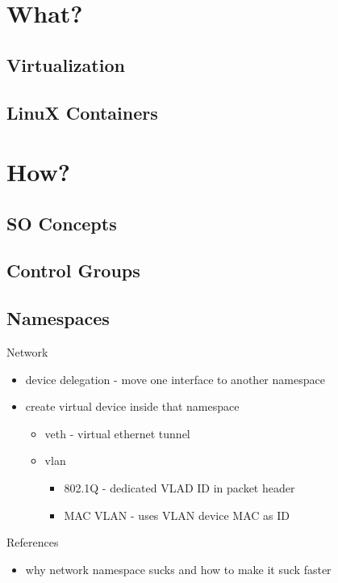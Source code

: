 \documentclass{beamer}
\begin{document}
\section{What?}

\subsection{Virtualization}

\subsection{LinuX Containers}

\section{How?}

\subsection{SO Concepts}

\subsection{Control Groups}

\subsection{Namespaces}

\begin{frame}{Network}
\begin{itemize}
\item device delegation - move one interface to another namespace
\item create virtual device inside that namespace
\begin{itemize}
\item veth - virtual ethernet tunnel
\item vlan
\begin{itemize}
\item 802.1Q - dedicated VLAD ID in packet header
\item MAC VLAN - uses VLAN device MAC as ID
\end{itemize}
\end{itemize}
\end{itemize}
\end{frame}

\begin{frame}{References}
\begin{itemize}
\item why network namespace sucks and how to make it suck faster
\end{itemize}
\end{frame}


\end{document}
